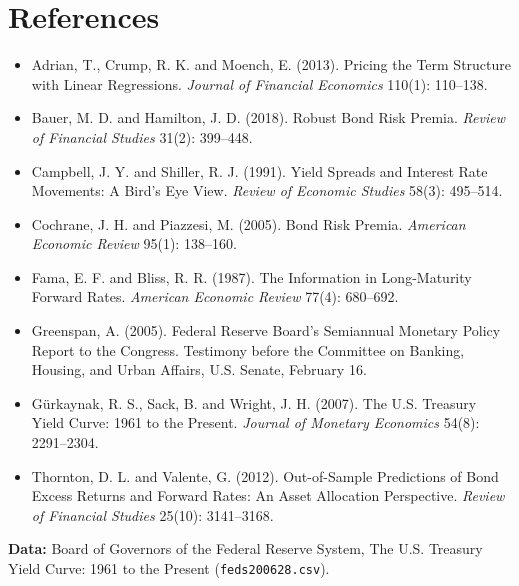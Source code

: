 \section*{References}

\begin{itemize}
  \item Adrian, T., Crump, R. K. and Moench, E. (2013). Pricing the Term Structure with Linear Regressions. \emph{Journal of Financial Economics} 110(1): 110--138.
  \item Bauer, M. D. and Hamilton, J. D. (2018). Robust Bond Risk Premia. \emph{Review of Financial Studies} 31(2): 399--448.
  \item Campbell, J. Y. and Shiller, R. J. (1991). Yield Spreads and Interest Rate Movements: A Bird's Eye View. \emph{Review of Economic Studies} 58(3): 495--514.
  \item Cochrane, J. H. and Piazzesi, M. (2005). Bond Risk Premia. \emph{American Economic Review} 95(1): 138--160.
  \item Fama, E. F. and Bliss, R. R. (1987). The Information in Long-Maturity Forward Rates. \emph{American Economic Review} 77(4): 680--692.
  \item Greenspan, A. (2005). Federal Reserve Board's Semiannual Monetary Policy Report to the Congress. Testimony before the Committee on Banking, Housing, and Urban Affairs, U.S. Senate, February 16.
  \item G\"urkaynak, R. S., Sack, B. and Wright, J. H. (2007). The U.S. Treasury Yield Curve: 1961 to the Present. \emph{Journal of Monetary Economics} 54(8): 2291--2304.
  \item Thornton, D. L. and Valente, G. (2012). Out-of-Sample Predictions of Bond Excess Returns and Forward Rates: An Asset Allocation Perspective. \emph{Review of Financial Studies} 25(10): 3141--3168.
\end{itemize}

\textbf{Data:} Board of Governors of the Federal Reserve System, The U.S. Treasury Yield Curve: 1961 to the Present (\texttt{feds200628.csv}).
